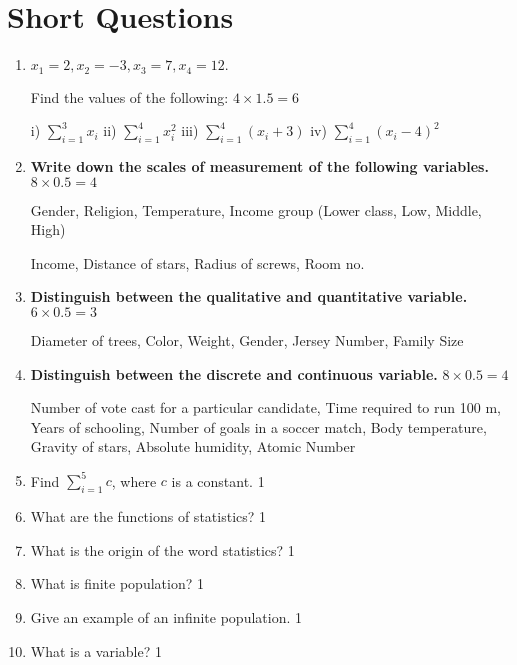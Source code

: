 \documentclass[a4paper,oneside]{book}
\begin{document}
\section{Short Questions}
\begin{enumerate}
    \item
	$x_1=2, x_2=-3, x_3=7, x_4=12.$ 
	
	Find the values of the following: \hfill $4 \times 1.5 = 6$
	
	i) $\displaystyle \sum_{i=1}^3 x_i$ 
	ii) $\displaystyle \sum_{i=1}^4 x_i^2$
	iii) $\displaystyle \sum_{i=1}^4 (x_i+3)$
	iv) $\displaystyle \sum_{i=1}^4 (x_i-4)^2$
	
	
	\item \textbf{Write down the scales of measurement of the following variables.} \hfill $8 \times 0.5 = 4$

	Gender, Religion, Temperature, Income group (Lower class, Low, Middle, High)
	
Income, Distance of stars, Radius of screws, Room no.

\item \textbf{Distinguish between the qualitative and quantitative variable.} \hfill $6 \times 0.5 = 3$

Diameter of trees, Color, Weight, Gender, Jersey Number, Family Size

\item \textbf{Distinguish between the discrete and continuous variable.} \hfill $8 \times 0.5 = 4$

Number of vote cast for a particular candidate, Time required to run 100 m, Years of schooling, Number of goals in a soccer match, Body temperature, Gravity of stars, Absolute humidity, Atomic Number

\item Find $\displaystyle \sum_{i=1}^5 c$, where $c$ is a constant. \hfill 1

\item What are the functions of statistics? \hfill 1

\item What is the origin of the word statistics? \hfill 1

\item What is finite population? \hfill 1

\item Give an example of an infinite population. \hfill 1

\item What is a variable? \hfill 1


\end{enumerate}
\end{document}
